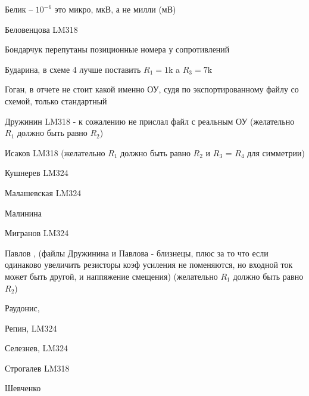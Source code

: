 \documentclass[a4paper,11pt]{article}
\begin{document}
Белик        -- $10^{-6}$ это микро, мкВ, а не милли (мВ)

Беловенцова     LM318

Бондарчук  перепутаны позиционные номера у сопротивлений

Бударина, в схеме 4 лучше поставить $R_1=1$k a $R_3=7$k

Гоган, в отчете не стоит какой именно ОУ, судя по экспортированному файлу со схемой, только стандартный

Дружинин  LM318 - к сожалению не прислал файл с реальным ОУ (желательно $R_1$ должно быть равно $R_2$)

Исаков  LM318 (желательно $R_1$ должно быть равно $R_2$ и $R_3$ = $R_4$  для симметрии)

Кушнерев LM324

Малашевская LM324

Малинина

Мигранов LM324


Павлов , (файлы Дружинина и Павлова - близнецы, плюс за то что если одинаково увеличить резисторы коэф усиления не поменяются, но входной ток может быть другой, и наппяжение смещения)
(желательно $R_1$ должно быть равно $R_2$)

Раудонис, 

Репин, LM324

Селезнев, LM324

Строгалев LM318

Шевченко
\end{document}

